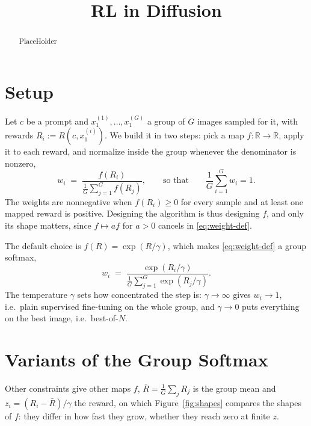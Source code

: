 \documentclass[10pt]{article} %
\title{RL in Diffusion}
\begin{document}
\maketitle

\begin{abstract}
PlaceHolder
\end{abstract}

\section{Setup}
\label{sec:setup}
Let $c$ be a prompt and $x_1^{(1)},\dots,x_1^{(G)}$ a group of $G$ images sampled for it, with rewards
$R_i:=R(c,x_1^{(i)})$. We build it in two steps: pick a map
$f:\mathbb{R}\to\mathbb{R}$, apply it to each reward, and normalize inside the group
whenever the denominator is nonzero,
\begin{equation}\label{eq:weight-def}
w_i\;=\;\frac{f(R_i)}{\frac{1}{G}\sum_{j=1}^{G}f(R_j)},
\qquad\text{so that}\qquad
\frac{1}{G}\sum_{i=1}^{G}w_i=1 .
\end{equation}
The weights are nonnegative when $f(R_i)\ge0$ for every sample and at least
one mapped reward is positive.
Designing the algorithm is thus designing $f$, and only its shape
matters, since $f\mapsto af$ for $a>0$ cancels in \eqref{eq:weight-def}.

The default choice is $f(R)=\exp(R/\gamma)$, which makes \eqref{eq:weight-def} a group softmax,
\begin{equation}\label{eq:awr-group}
w_i\;=\;\frac{\exp(R_i/\gamma)}{\frac{1}{G}\sum_{j=1}^{G}\exp(R_j/\gamma)} .
\end{equation}
The
temperature $\gamma$ sets how concentrated the step is: $\gamma\to\infty$ gives $w_i\to1$, i.e.\ plain
supervised fine-tuning on the whole group, and $\gamma\to0$ puts everything on the best image, i.e.\
best-of-$N$.

\section{Variants of the Group Softmax}
\label{sec:variants}
Other constraints give other maps $f$,
$\bar{R}=\tfrac1G\sum_j R_j$ is the group mean and $z_i=(R_i-\bar{R})/\gamma$ the  reward, on
which Figure~\ref{fig:shapes} compares the shapes of $f$: they differ in how fast they grow, whether they reach zero at finite $z$.
\end{document}
